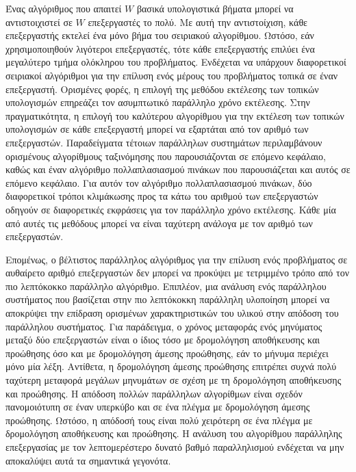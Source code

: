 \documentclass[12pt,a4paper]{article} %
\begin{document}
Ένας αλγόριθμος που απαιτεί $W$ βασικά υπολογιστικά βήματα μπορεί να 
αντιστοιχιστεί σε $W$ επεξεργαστές το πολύ. Με αυτή την αντιστοίχιση, 
κάθε επεξεργαστής εκτελεί ένα μόνο βήμα του σειριακού αλγορίθμου. Ωστόσο, 
εάν χρησιμοποιηθούν λιγότεροι επεξεργαστές, τότε κάθε επεξεργαστής επιλύει 
ένα μεγαλύτερο τμήμα ολόκληρου του προβλήματος. Ενδέχεται να υπάρχουν 
διαφορετικοί σειριακοί αλγόριθμοι για την επίλυση ενός μέρους του προβλήματος 
τοπικά σε έναν επεξεργαστή. Ορισμένες φορές, η επιλογή της μεθόδου 
εκτέλεσης των τοπικών υπολογισμών επηρεάζει τον ασυμπτωτικό παράλληλο 
χρόνο εκτέλεσης. Στην πραγματικότητα, η επιλογή του καλύτερου αλγορίθμου 
για την εκτέλεση των τοπικών υπολογισμών σε κάθε επεξεργαστή μπορεί να 
εξαρτάται από τον αριθμό των επεξεργαστών. Παραδείγματα τέτοιων παράλληλων 
συστημάτων περιλαμβάνουν ορισμένους αλγορίθμους ταξινόμησης που παρουσιάζονται 
σε επόμενο κεφάλαιο, καθώς και έναν αλγόριθμο πολλαπλασιασμού πινάκων που 
παρουσιάζεται και αυτός σε επόμενο κεφάλαιο. Για αυτόν τον αλγόριθμο 
πολλαπλασιασμού πινάκων, δύο διαφορετικοί τρόποι κλιμάκωσης προς τα κάτω 
του αριθμού των επεξεργαστών οδηγούν σε διαφορετικές εκφράσεις για τον 
παράλληλο χρόνο εκτέλεσης. Κάθε μία από αυτές τις μεθόδους μπορεί να είναι 
ταχύτερη ανάλογα με τον αριθμό των επεξεργαστών.

Επομένως, ο βέλτιστος παράλληλος αλγόριθμος για την επίλυση ενός προβλήματος 
σε αυθαίρετο αριθμό επεξεργαστών δεν μπορεί να προκύψει με τετριμμένο τρόπο 
από τον πιο λεπτόκοκκο παράλληλο αλγόριθμο. Επιπλέον, μια ανάλυση ενός 
παράλληλου συστήματος που βασίζεται στην πιο λεπτόκοκκη παράλληλη υλοποίηση 
μπορεί να αποκρύψει την επίδραση ορισμένων χαρακτηριστικών του υλικού στην 
απόδοση του παράλληλου συστήματος. Για παράδειγμα, ο χρόνος μεταφοράς ενός 
μηνύματος μεταξύ δύο επεξεργαστών είναι ο ίδιος τόσο με δρομολόγηση 
αποθήκευσης και προώθησης όσο και με δρομολόγηση άμεσης προώθησης, εάν το 
μήνυμα περιέχει μόνο μία λέξη. Αντίθετα, η δρομολόγηση άμεσης προώθησης 
επιτρέπει συχνά πολύ ταχύτερη μεταφορά μεγάλων μηνυμάτων σε σχέση με τη 
δρομολόγηση αποθήκευσης και προώθησης. Η απόδοση πολλών παράλληλων αλγορίθμων 
είναι σχεδόν πανομοιότυπη σε έναν υπερκύβο και σε ένα πλέγμα με δρομολόγηση 
άμεσης προώθησης. Ωστόσο, η απόδοσή τους είναι πολύ χειρότερη σε ένα 
πλέγμα με δρομολόγηση αποθήκευσης και προώθησης. Η ανάλυση του αλγορίθμου 
παράλληλης επεξεργασίας με τον λεπτομερέστερο δυνατό βαθμό παραλληλισμού 
ενδέχεται να μην αποκαλύψει αυτά τα σημαντικά γεγονότα. 
\end{document}
